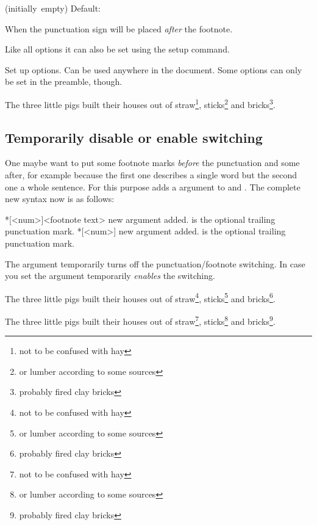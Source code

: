 \documentclass[toc=index,toc=bib]{cnpkgdoc}
\newcommand*\Default[1]{%
  \hfill\llap
    {%
      \ifblank{#1}%
        {(initially~empty)}%
        {Default:~\code{#1}}%
    }%
  \newline
}
\begin{document}
\begin{beschreibung}
 \Default{false}
   When  the punctuation sign will be placed \emph{after} the footnote.
\end{beschreibung}
Like all options it can also be set using the setup command.
\begin{beschreibung}
   Set up options. Can be used anywhere in the document. Some options can only
   be set in the preamble, though.
\end{beschreibung}
\begin{beispiel}
 \begin{minipage}{.4\linewidth}
  \noindent The three little pigs built their houses
  out of straw\footnote{not to be confused with hay},
  sticks\footnote{or lumber according to some sources}
  and bricks\footnote{probably fired clay bricks}.
 \end{minipage}
\end{beispiel}

\subsection{Temporarily disable or enable switching}
One maybe want to put some footnote marks \emph{before} the punctuation and some
after, for example because the first one describes a single word but the second
one a whole sentence. For this purpose \fnpct adds a \code{*} argument to 
and . The complete new syntax now is as follows:
\begin{beschreibung}
 *[<num>]{<footnote text>}\newline
   new \code{*} argument added.  is the optional trailing
   punctuation mark.
 *[<num>]\newline
   new \code{*} argument added.  is the optional trailing
   punctuation mark.
\end{beschreibung}
The \code{*} argument temporarily turns off the punctuation/footnote switching.
In case you set  the \code{*} argument temporarily
\emph{enables} the switching.
\begin{beispiel}
 \begin{minipage}{.4\linewidth}
  \noindent The three little pigs built their houses
  out of straw\footnote*{not to be confused with hay},
  sticks\footnote{or lumber according to some sources}
  and bricks\footnote{probably fired clay bricks}.
 \end{minipage}\hfil
 \begin{minipage}{.4\linewidth}
  \noindent The three little pigs built their houses
  out of straw\footnote*{not to be confused with hay},
  sticks\footnote{or lumber according to some sources}
  and bricks\footnote{probably fired clay bricks}.
 \end{minipage}
\end{beispiel}
\end{document}
